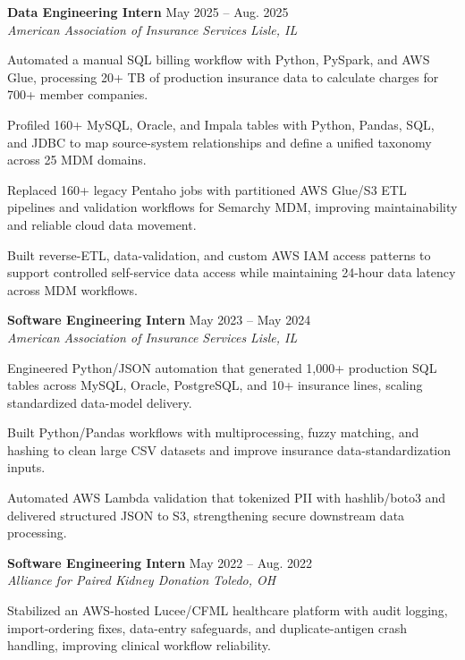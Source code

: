 \documentclass[letterpaper,11pt]{article}
\newcommand{\resumeSubheading}[4]{
  \textbf{#1} \hfill #2\\
  \textit{#3} \hfill \textit{#4}
}
\begin{document}
\resumeSubheading
{Data Engineering Intern}{May 2025 -- Aug. 2025}
{American Association of Insurance Services}{Lisle, IL}
\begin{tightitemize}
  \item Automated a manual SQL billing workflow with Python, PySpark, and AWS Glue, processing 20+ TB of production insurance data to calculate charges for 700+ member companies.
  \item Profiled 160+ MySQL, Oracle, and Impala tables with Python, Pandas, SQL, and JDBC to map source-system relationships and define a unified taxonomy across 25 MDM domains.
  \item Replaced 160+ legacy Pentaho jobs with partitioned AWS Glue/S3 ETL pipelines and validation workflows for Semarchy MDM, improving maintainability and reliable cloud data movement.
  \item Built reverse-ETL, data-validation, and custom AWS IAM access patterns to support controlled self-service data access while maintaining 24-hour data latency across MDM workflows.
\end{tightitemize}

\resumeSubheading
{Software Engineering Intern}{May 2023 -- May 2024}
{American Association of Insurance Services}{Lisle, IL}
\begin{tightitemize}
  \item Engineered Python/JSON automation that generated 1,000+ production SQL tables across MySQL, Oracle, PostgreSQL, and 10+ insurance lines, scaling standardized data-model delivery.
  \item Built Python/Pandas workflows with multiprocessing, fuzzy matching, and hashing to clean large CSV datasets and improve insurance data-standardization inputs.
  \item Automated AWS Lambda validation that tokenized PII with hashlib/boto3 and delivered structured JSON to S3, strengthening secure downstream data processing.
\end{tightitemize}

\resumeSubheading
{Software Engineering Intern}{May 2022 -- Aug. 2022}
{Alliance for Paired Kidney Donation}{Toledo, OH}
\begin{tightitemize}
  \item Stabilized an AWS-hosted Lucee/CFML healthcare platform with audit logging, import-ordering fixes, data-entry safeguards, and duplicate-antigen crash handling, improving clinical workflow reliability.
\end{tightitemize}
\end{document}

